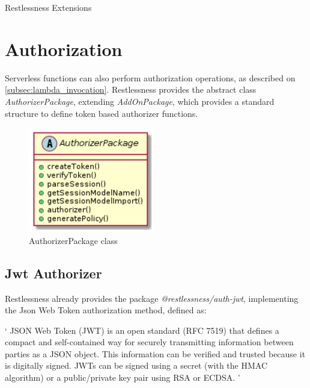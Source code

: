 \begin{chapter}{Restlessness Extensions}
    \label{chap:extensions}

    \section{Authorization}
    Serverless functions can also perform authorization operations, as described
    on \ref{subsec:lambda_invocation}. Restlessness provides the abstract class
    \textit{AuthorizerPackage}, extending \textit{AddOnPackage}, which provides
    a standard structure to define token based authorizer functions.

    \begin{figure}
        \centering
        \includegraphics[width=5.5cm]{source/diagrams/authorizer_package_class.png}
        \caption{AuthorizerPackage class}
    \end{figure}

    \subsection{Jwt Authorizer}
    Restlessness already provides the package \mbox{\textit{@restlessness/auth-jwt}},
    implementing the Json Web Token authorization method, defined as:

    \enquote*{%
        JSON Web Token (JWT) is an open standard (RFC 7519) that defines a compact
        and self-contained way for securely transmitting information between parties
        as a JSON object. This information can be verified and trusted because it
        is digitally signed. JWTs can be signed using a secret (with the HMAC
        algorithm) or a public/private key pair using RSA or ECDSA.%
    } \cite{json_web_token}


\end{chapter}
